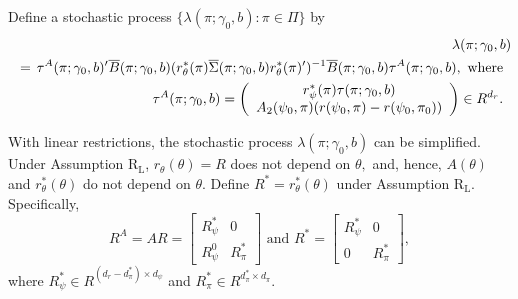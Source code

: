 \documentclass[12pt,titlepage,final,oneside,letterpaper]{article}
\begin{document}
Define a stochastic process $\{\lambda (\pi ;\gamma _{0},b):\pi \in \Pi \}$
by%
\begin{eqnarray}
&&\hspace{-0.08in}\lambda (\pi ;\gamma _{0},b)\hspace{-0.08in}  \notag \\
&=&\hspace{-0.08in}\tau ^{A}(\pi ;\gamma _{0},b)^{\prime }\overline{B}(\pi
;\gamma _{0},b)(r_{\theta }^{\ast }(\pi )\overline{\Sigma }(\pi ;\gamma
_{0},b)r_{\theta }^{\ast }(\pi )^{\prime })^{-1}\overline{B}(\pi ;\gamma
_{0},b)\tau ^{A}(\pi ;\gamma _{0},b),\text{ where}  \notag \\
&&\hspace{-0.25in}\tau ^{A}(\pi ;\gamma _{0},b)\overset{}{=}\left( 
\begin{array}{c}
r_{\psi }^{\ast }(\pi )\tau (\pi ;\gamma _{0},b) \\ 
A_{2}(\psi _{0},\pi )(r(\psi _{0},\pi )-r(\psi _{0},\pi _{0}))%
\end{array}%
\right) \overset{}{\in }R^{d_{r}}.
\end{eqnarray}

With linear restrictions, the stochastic process $\lambda (\pi ;\gamma
_{0},b)$ can be simplified. Under Assumption R$_{\text{L}}$, $r_{\theta
}(\theta )=R$ does not depend on $\theta ,$ and, hence, $A(\theta )$ and $%
r_{\theta }^{\ast }(\theta )$ do not depend on $\theta .$ Define $R^{\ast
}=r_{\theta }^{\ast }(\theta )$ under Assumption R$_{\text{L}}$.
Specifically, 
\begin{equation}
R^{A}=AR=\left[ 
\begin{array}{cc}
R_{\psi }^{\ast } & 0 \\ 
R_{\psi }^{0} & R_{\pi }^{\ast }%
\end{array}%
\right] \text{ and }R^{\ast }=\left[ 
\begin{array}{cc}
R_{\psi }^{\ast } & 0 \\ 
0 & R_{\pi }^{\ast }%
\end{array}%
\right] ,
\end{equation}%
where $R_{\psi }^{\ast }\in R^{(d_{r}-d_{\pi }^{\ast })\times d_{\psi }}$
and $R_{\pi }^{\ast }\in R^{d_{\pi }^{\ast }\times d_{\pi }}.$
\end{document}
